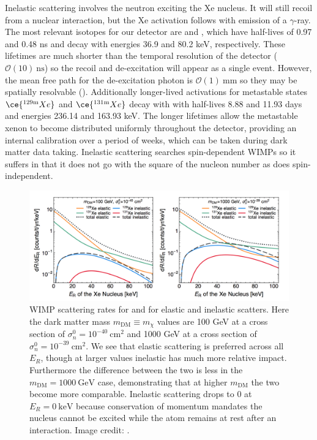 Inelastic scattering involves the neutron exciting the Xe nucleus.  It will still recoil from a nuclear interaction, but the Xe
activation follows with emission of a $\gamma$-ray.  The most relevant isotopes for our detector are  and ,
which have half-lives of 0.97 and 0.48 ns and decay with energies 36.9 and 80.2 keV, respectively.  These lifetimes are much shorter
than the temporal resolution of the detector ($\mathcal{O}(10)\ \mathrm{ns}$) so the recoil and de-excitation will appear as a single
event.  However, the mean free path for the de-excitation photon is $\mathcal{O}(1)\ \mathrm{mm}$ so they may be spatially
resolvable ().  Additionally longer-lived activations for metastable
states $\ce{^{129\mathrm{m}}Xe}$ and $\ce{^{131\mathrm{m}}Xe}$ decay with with half-lives 8.88 and 11.93 days and energies 236.14 and 163.93 keV.  The
longer lifetimes allow the metastable xenon to become distributed uniformly throughout the detector, providing an internal calibration
over a period of weeks, which can be taken during dark matter data taking.  Inelastic scattering searches spin-dependent WIMPs so it
suffers in that it does not go with the square of the nucleon number as does spin-independent.

\begin{figure}
\includegraphics[width=\textwidth]{ElasticInelasticRates}
\caption{WIMP scattering rates for  and  for elastic and inelastic scatters.  Here the dark matter mass
$m_{\mathrm{DM}} \equiv m_{\chi}$ values are 100 GeV at a cross section of $\sigma_{n}^{0} = 10^{-40}\ \mathrm{cm^{2}}$ and
1000 GeV at a cross section of $\sigma_{n}^{0} = 10^{-39}\ \mathrm{cm^{2}}$. We see that elastic scattering is preferred across all
$E_{R}$, though at larger values inelastic has much more relative impact.  Furthermore the difference between the two is less in the
$m_{\mathrm{DM}} = 1000\ \mathrm{GeV}$ case, demonstrating that at higher $m_{\mathrm{DM}}$ the two become more comparable.  Inelastic
scattering drops to 0 at 
$E_{R} = 0\ \mathrm{keV}$ because conservation of momentum mandates the nucleus cannot be excited while the atom remains at rest
after an interaction.  Image credit: .}
\label{fig:nr_elastic_inelastic}
\end{figure}

